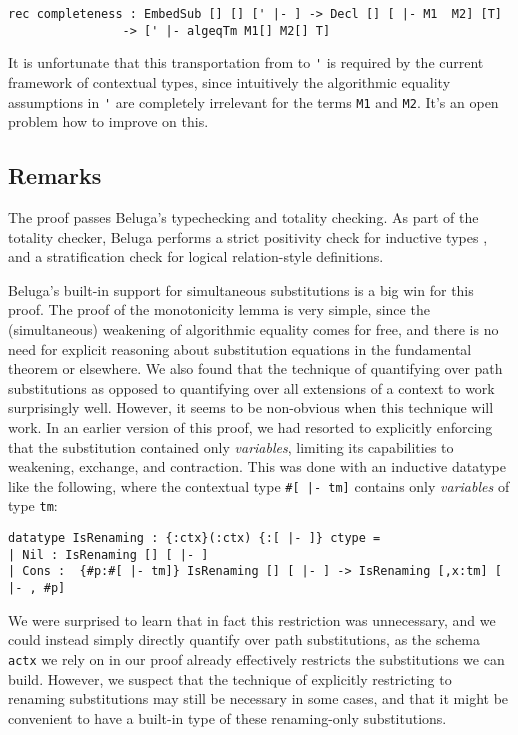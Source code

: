 \documentclass[copyright,creativecommons]{eptcs}
\begin{document}
\begin{lstlisting}
rec completeness : EmbedSub [] [] [' |- ] -> Decl [] [ |- M1  M2] [T]
                -> [' |- algeqTm M1[] M2[] T]
\end{lstlisting}

It is unfortunate that this transportation from
\lstinline{} to \lstinline{'} is required by the current framework of contextual types, since intuitively the
algorithmic equality assumptions in \lstinline{'} are completely
irrelevant for the terms \lstinline{M1} and \lstinline{M2}. It's an
open problem how to improve on this.

\subsection{Remarks}
The proof passes Beluga's typechecking and totality checking. As part of the
totality checker, Beluga performs a strict positivity check for inductive types \citep{Pientka:TLCA15,Pientka:CADE15}, and a stratification check for logical relation-style definitions.

Beluga's built-in support for simultaneous substitutions is a big win
for this proof. The proof of the monotonicity lemma is very simple, since
the (simultaneous) weakening of algorithmic equality comes for free, and there is no
need for explicit reasoning about substitution equations in the
fundamental theorem or elsewhere.  We also found that the technique of
quantifying over path substitutions as opposed to quantifying over all
extensions of a context to work surprisingly well. However, it seems
to be non-obvious when this technique will work. In an earlier version
of this proof, we had resorted to explicitly enforcing that the
substitution  contained only \emph{variables}, limiting its
capabilities to weakening, exchange, and contraction. This was done
with an inductive datatype like the following, where the contextual type
\lstinline{#[ |- tm]} contains only \emph{variables} of type \lstinline{tm}:

\begin{lstlisting}
datatype IsRenaming : {:ctx}(:ctx) {:[ |- ]} ctype =
| Nil : IsRenaming [] [ |- ]
| Cons :  {#p:#[ |- tm]} IsRenaming [] [ |- ] -> IsRenaming [,x:tm] [ |- , #p]
\end{lstlisting}

We were surprised to learn that in fact this restriction was
unnecessary, and we could instead simply directly quantify over path
substitutions, as the schema \lstinline!actx! we rely on in our proof
already effectively restricts the substitutions we can build. However, we
suspect that the technique of explicitly restricting to renaming substitutions
may still be necessary in some cases, and that it might be convenient to have a
built-in type of these renaming-only substitutions.
\end{document}
